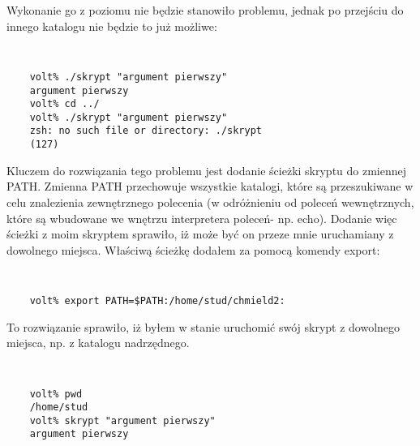 \documentclass[a4paper,11pt]{article}
\begin{document}
Wykonanie go z poziomu nie będzie stanowiło problemu, jednak po przejściu do innego katalogu nie będzie to już możliwe:

{\tt
\begin{verbatim}
    volt% ./skrypt "argument pierwszy"
    argument pierwszy
    volt% cd ../
    volt% ./skrypt "argument pierwszy"
    zsh: no such file or directory: ./skrypt
    (127)
\end{verbatim}
}

Kluczem do rozwiązania tego problemu jest dodanie ścieżki skryptu do zmiennej PATH. Zmienna PATH przechowuje wszystkie katalogi, które są przeszukiwane w celu znalezienia zewnętrznego polecenia (w odróżnieniu od poleceń wewnętrznych, które są wbudowane we wnętrzu interpretera poleceń- np. echo). Dodanie więc ścieżki z moim skryptem sprawiło, iż może być on przeze mnie uruchamiany z dowolnego miejsca. 
Właściwą ścieżkę dodałem za pomocą komendy export:

{\tt
\begin{verbatim}
    volt% export PATH=$PATH:/home/stud/chmield2:
\end{verbatim}
}

To rozwiązanie sprawiło, iż byłem w stanie uruchomić swój skrypt z dowolnego miejsca, np. z katalogu nadrzędnego.

{\tt
\begin{verbatim}
    volt% pwd
    /home/stud
    volt% skrypt "argument pierwszy"
    argument pierwszy
\end{verbatim}
}
\end{document}
